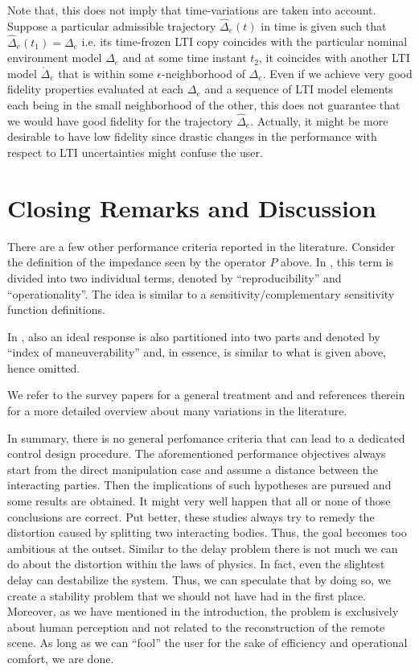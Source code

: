 Note that, this does not imply that time-variations are taken into account. Suppose a particular admissible trajectory
$\hat{\Delta}_e(t)$ in time is given such that $\hat{\Delta}_e(t_1)=\Delta_e$ i.e. its time-frozen LTI copy coincides 
with the particular nominal environment model $\Delta_e$ and at some time instant $t_2$, it  coincides with another 
LTI model $\mathring\Delta_e$ that is within some $\epsilon$-neighborhood of $\Delta_e$. Even if we achieve very good 
fidelity properties evaluated at each $\Delta_e$ and a sequence of LTI model elements each being in the small neighborhood 
of the other, this does not guarantee that we would have good fidelity for the trajectory $\hat{\Delta}_e$. Actually, 
it might be more desirable to have low fidelity since drastic changes in the performance with respect to LTI uncertainties
might confuse the user.


\section{Closing Remarks and Discussion}
There are a few other performance criteria reported in the literature. Consider the definition of the impedance seen by 
the operator $P$ above. In \cite{katsura}, this term is divided into two individual terms, denoted by 
\enquote{reproducibility} and \enquote{operationality}. The idea is similar to a sensitivity/complementary sensitivity 
function definitions. 

In \cite{yokokohjiyoshikawa}, also an ideal response is also partitioned into two parts and denoted by \enquote{index of 
maneuverability} and, in essence, is similar to what is given above, hence omitted. 

We refer to the survey papers \cite{hokayemspong,passenberg} for a general treatment and \cite{klomp,dennis} and references 
therein for a more detailed overview about many variations in the literature.


In summary, there is no general perfomance criteria that can lead to a dedicated control design procedure. The aforementioned 
performance objectives always start from the direct manipulation case and assume a distance between the interacting parties.
Then the implications of such hypotheses are pursued and some results are obtained. It might very well happen that all or none 
of those conclusions are correct. Put better, these studies always try to remedy the distortion caused by splitting two 
interacting bodies. Thus, the goal becomes too ambitious at the outset. Similar to the delay problem there is not much
we can do about the distortion within the laws of physics. In fact, even the slightest delay can destabilize the system. 
Thus, we can speculate that by doing so, we create a stability problem that we should not have had in the first place. Moreover, 
as we have mentioned in the introduction, the problem is exclusively about human perception and not related to the reconstruction 
of the remote scene. As long as we can \enquote{fool} the user for the sake of efficiency and operational comfort, we are done. 

